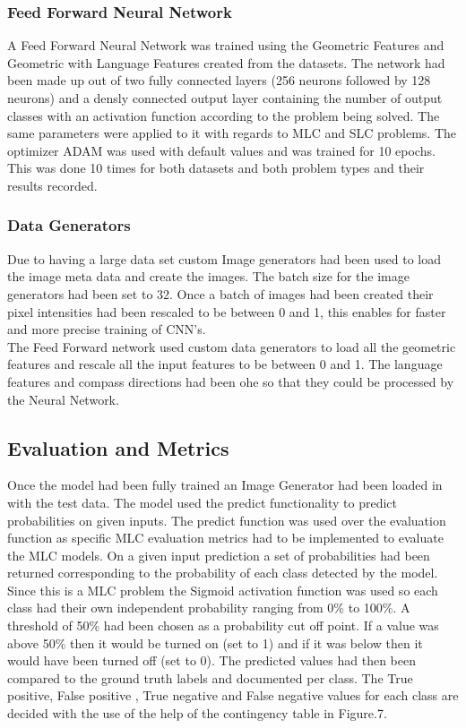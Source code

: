 \documentclass{csfyp}
\begin{document}
\subsubsection{Feed Forward Neural Network}
A Feed Forward Neural Network was trained using the Geometric Features and Geometric with Language Features created from the datasets. The network had been made up out of two fully connected layers (256 neurons followed by 128 neurons) and a densly connected output layer containing the number of output classes with an activation function according to the problem being solved. The same parameters were applied to it with regards to MLC and SLC problems. The optimizer ADAM was used with default values and was trained for 10 \Gls{epoch}s. This was done 10 times for both datasets and both problem types and their results recorded.

\subsubsection{Data Generators}
Due to having a large data set custom Image generators had been used to load the image meta data and create the images. The batch size for the image generators had been set to 32. Once a batch of images had been created their pixel intensities had been rescaled to be between 0 and 1, this enables for faster and more precise training of CNN’s.
\\
The Feed Forward network used custom data generators to load all the geometric features and rescale all the input features to be between 0 and 1. The language features and compass directions had been \Gls{ohe} so that they could be processed by the Neural Network.

\subsection{Evaluation and Metrics}
Once the model had been fully trained an Image Generator had been loaded in with the test data. The model used the predict functionality to predict probabilities on given inputs. The predict function was used over the evaluation function as specific MLC evaluation metrics had to be implemented to evaluate the MLC models. On a given input prediction a set of probabilities had been returned corresponding to the probability of each class detected by the model. Since this is a MLC problem the Sigmoid activation function was used so each class had their own independent probability ranging from 0\% to 100\%. A threshold of 50\% had been chosen as a probability cut off point. If a value was above 50\% then it would be turned on (set to 1) and if it was below then it would have been turned off (set to 0). The predicted values had then been compared to the ground truth labels and documented per class. The True positive, False positive , True negative and False negative values for each class are decided with the use of the help of the contingency table in Figure.7.
\end{document}
